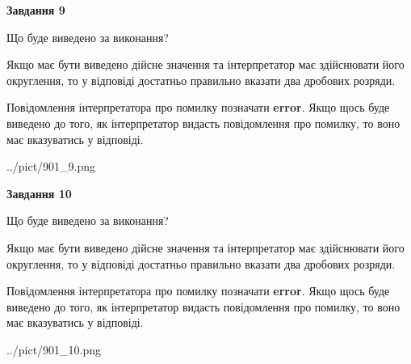 \documentclass[12pt, ukrainian]{article}
\begin{document}
{\begin {Large}
{\begin {center}\textbf{Завдання 9}\end {center}}\par
Що буде виведено за виконання? \par

Якщо має бути виведено дійсне значення та інтерпретатор має здійснювати його округлення, 
то у відповіді достатньо правильно вказати два дробових розряди.

Повідомлення інтерпретатора про помилку позначати \textbf{error}.
Якщо щось буде виведено до того, як інтерпретатор видасть повідомлення про помилку, 
то воно має вказуватись у відповіді. \par

\begin{center}
	{../pict/901_9.png}
\end{center}
\newpage

{\begin {center}\textbf{Завдання 10}\end {center}}\par
Що буде виведено за виконання? \par

Якщо має бути виведено дійсне значення та інтерпретатор має здійснювати його округлення, 
то у відповіді достатньо правильно вказати два дробових розряди.

Повідомлення інтерпретатора про помилку позначати \textbf{error}.
Якщо щось буде виведено до того, як інтерпретатор видасть повідомлення про помилку, 
то воно має вказуватись у відповіді. \par

\begin{center}
	{../pict/901_10.png}
\end{center}
\newpage

\end {Large}}
\end{document}
